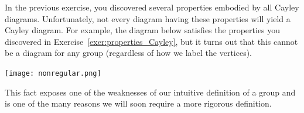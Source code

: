 In the previous exercise, you discovered several properties embodied by all Cayley diagrams. Unfortunately, not every diagram having these properties will yield a Cayley diagram.  For example, the diagram below satisfies the properties you discovered in Exercise~\ref{exer:properties_Cayley}, but it turns out that this cannot be a diagram for any group (regardless of how we label the vertices).

\begin{center}
\texttt{[image: nonregular.png]}
\end{center}

This fact exposes one of the weaknesses of our intuitive definition of a group and is one of the many reasons we will soon require a more rigorous definition.
